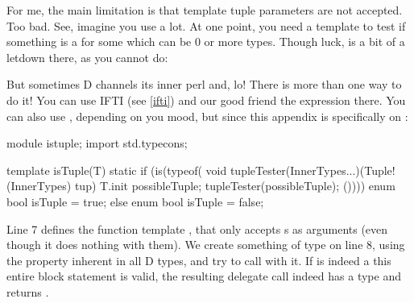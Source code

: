 

For me, the main limitation is that template tuple parameters are not accepted. Too bad. See, imagine you use  a lot. At one point, you need a template to test if something is a  for some  which can be 0 or more types. Though luck,  is a bit of a letdown there, as you cannot do:

\begin{dcode}
template isTuple(T)
{
    static if (is(T tup == Tuple!(InnerTypes), InnerTypes...)
(...)                                          ^^^^^^^^^^^^^
\end{dcode}

But sometimes D channels its inner perl and, lo! There is more than one way to do it! You can use IFTI (see \ref{ifti}) and our good friend the \DD{(} expression there. You can also use , depending on you mood, but since this appendix is specifically on :

\begin{ndcode}
module istuple;
import std.typecons;

template isTuple(T)
{
    static if (is(typeof({
              void tupleTester(InnerTypes...)(Tuple!(InnerTypes) tup) {}
              T.init possibleTuple;
              tupleTester(possibleTuple);
              }())))
        enum bool isTuple = true;
    else
        enum bool isTuple = false;
}
\end{ndcode}

Line 7 defines the function template , that only accepts s as arguments (even though it does nothing with them). We create something of type  on line 8, using the  property inherent in all D types, and try to call  with it. If  is indeed a  this entire block statement is valid, the resulting delegate call indeed has a type and  returns .

